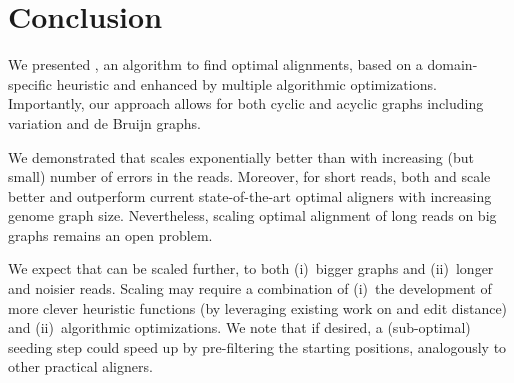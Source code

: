 \section{Conclusion}
We presented \astarix, an \A algorithm to find optimal alignments, based on a
domain-specific heuristic and enhanced by multiple algorithmic optimizations.
Importantly, our approach allows for both cyclic and acyclic graphs including
variation and de Bruijn graphs.

We demonstrated that \astarix scales exponentially better than \dijkstra with
increasing (but small) number of errors in the reads. Moreover, for short reads,
both \astarix and \dijkstra scale better and outperform current state-of-the-art
optimal aligners with increasing genome graph size. Nevertheless, scaling
optimal alignment of long reads on big graphs remains an open problem.

We expect that \astarix can be scaled further, to both (i)~bigger graphs and
(ii)~longer and noisier reads. Scaling \astarix may require a combination of
(i)~the development of more clever heuristic functions (by leveraging existing
work on \A and edit distance) and (ii)~algorithmic optimizations. We note that
if desired, a (sub-optimal) seeding step could speed up \astarix by
pre-filtering the starting positions, analogously to other practical aligners.